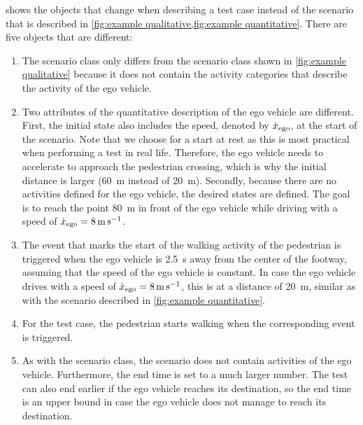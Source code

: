  shows the objects that change when describing a test case instead of the scenario that is described in \cref{fig:example qualitative,fig:example quantitative}. There are five objects that are different:
\begin{enumerate}
	\item The scenario class only differs from the scenario class shown in \cref{fig:example qualitative} because it does not contain the activity categories that describe the activity of the ego vehicle.
	\item Two attributes of the quantitative description of the ego vehicle are different. First, the initial state also includes the speed, denoted by $\dot{x}_{\mathrm{ego}}$, at the start of the scenario. Note that we choose for a start at rest as this is most practical when performing a test in real life. Therefore, the ego vehicle needs to accelerate to approach the pedestrian crossing, which is why the initial distance is larger (\SI{60}{\meter} instead of \SI{20}{\meter}). Secondly, because there are no activities defined for the ego vehicle, the desired states are defined. The goal is to reach the point \SI{80}{\meter} in front of the ego vehicle while driving with a speed of $\dot{x}_{\mathrm{ego}}=\SI{8}{\meter\per\second}$.
	\item The event that marks the start of the walking activity of the pedestrian is triggered when the ego vehicle is \SI{2.5}{\second} away from the center of the footway, assuming that the speed of the ego vehicle is constant. In case the ego vehicle drives with a speed of $\dot{x}_{\mathrm{ego}}=\SI{8}{\meter\per\second}$, this is at a distance of \SI{20}{\meter}, similar as with the scenario described in \cref{fig:example quantitative}.
	\item For the test case, the pedestrian starts walking when the corresponding event is triggered.
	\item As with the scenario class, the scenario does not contain activities of the ego vehicle. Furthermore, the end time is set to a much larger number. The test can also end earlier if the ego vehicle reaches its destination, so the end time is an upper bound in case the ego vehicle does not manage to reach its destination.
\end{enumerate}  

\cbend
